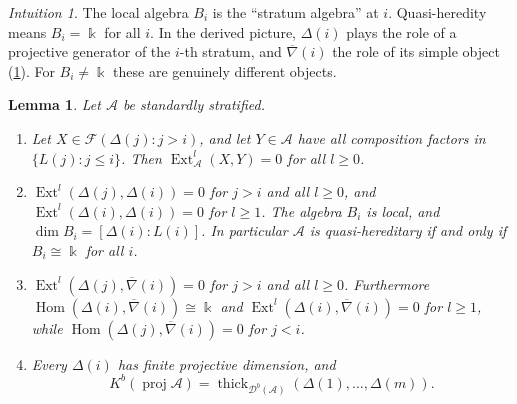 \documentclass[11pt,reqno]{amsart}
\theoremstyle{plain}
\newtheorem{lemma}[theorem]{Lemma}
\theoremstyle{definition}
\theoremstyle{remark}
\newtheorem*{intuition}{Intuition}
\newcommand{\kk}{\Bbbk}
\DeclareMathOperator{\Hom}{Hom}
\DeclareMathOperator{\Ext}{Ext}
\newcommand{\proj}{\operatorname{proj}}
\newcommand{\Db}{\mathcal{D}^b}
\newcommand{\Kb}{K^b}
\newcommand{\thick}[2][\cD]{\operatorname{thick}_{#1}(#2)}
\newcommand{\nablabar}{\overline{\nabla}}
\newcommand{\cD}{\mathcal{D}}
\newcommand{\cA}{\mathcal{A}}
\newcommand{\cF}{\mathcal{F}}
\begin{document}
\begin{intuition}
The local algebra $B_i$ is the ``stratum algebra'' at $i$. Quasi-heredity means $B_i=\kk$ for all $i$. In the derived picture, $\Delta(i)$ plays the role of a projective generator of the $i$-th stratum, and $\nablabar(i)$ the role of its simple object (\cref{lem:strat-basic}). For $B_i\ne\kk$ these are genuinely different objects.
\end{intuition}

\begin{lemma}\label{lem:strat-basic}
Let $\cA$ be standardly stratified.
\begin{enumerate}
\item Let $X\in\cF(\Delta(j):j>i)$, and let $Y\in\cA$ have all composition factors in $\{L(j):j\le i\}$. Then $\Ext^l_\cA(X,Y)=0$ for all $l\ge0$.
\item $\Ext^l(\Delta(j),\Delta(i))=0$ for $j>i$ and all $l\ge0$, and $\Ext^l(\Delta(i),\Delta(i))=0$ for $l\ge1$. The algebra $B_i$ is local, and $\dim B_i=[\Delta(i):L(i)]$. In particular $\cA$ is quasi-hereditary if and only if $B_i\cong\kk$ for all $i$.
\item $\Ext^l(\Delta(j),\nablabar(i))=0$ for $j>i$ and all $l\ge0$. Furthermore $\Hom(\Delta(i),\nablabar(i))\cong\kk$ and $\Ext^l(\Delta(i),\nablabar(i))=0$ for $l\ge1$, while $\Hom(\Delta(j),\nablabar(i))=0$ for $j<i$.
\item Every $\Delta(i)$ has finite projective dimension, and
\[\Kb(\proj\cA)=\thick[\Db(\cA)]{\Delta(1),\dots,\Delta(m)}.\]
\end{enumerate}
\end{lemma}
\end{document}
